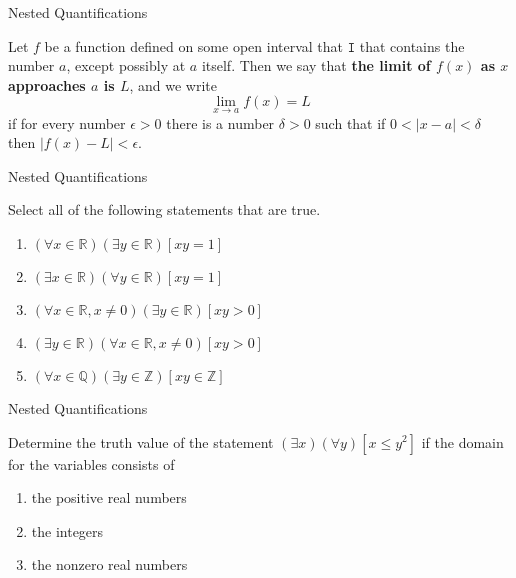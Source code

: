 \documentclass{beamer}
\begin{document}
\begin{frame}[t]{Nested Quantifications}
    \begin{definition}
        Let $f$ be a function defined on some open interval that $\texttt{I}$ that contains the number $a$, except possibly at $a$ itself. Then we say that \textbf{the limit of $f(x)$ as $x$ approaches $a$ is $L$}, and we write $$\lim_{x \to a} f(x) = L$$ if for every number $\epsilon > 0$ there is a number $\delta > 0$ such that if $0 < |x - a| < \delta$ then $|f(x) - L| < \epsilon$.
    \end{definition}
\end{frame}

\begin{frame}[t]{Nested Quantifications}
    \begin{example}
        Select all of the following statements that are true. 
        \begin{enumerate}
            \item $(\forall x \in \mathbb{R})(\exists y \in \mathbb{R})[xy = 1]$
            \item $(\exists x \in \mathbb{R})(\forall y \in \mathbb{R})[xy = 1]$
            \item $(\forall x \in \mathbb{R}, x \neq 0)(\exists y \in \mathbb{R})[xy > 0]$
            \item $(\exists y \in \mathbb{R})(\forall x \in \mathbb{R}, x \neq 0)[xy > 0]$
            \item $(\forall x \in \mathbb{Q})(\exists y \in \mathbb{Z})[xy \in \mathbb{Z}]$
        \end{enumerate}
    \end{example}
\end{frame}

\begin{frame}[t]{Nested Quantifications}
    \begin{example}
        Determine the truth value of the statement $(\exists x)(\forall y)[x \leq y^2]$ if the domain for the variables consists of 
        \begin{enumerate}
            \item the positive real numbers
            \item the integers
            \item the nonzero real numbers
        \end{enumerate}
    \end{example}
\end{frame}
\end{document}
